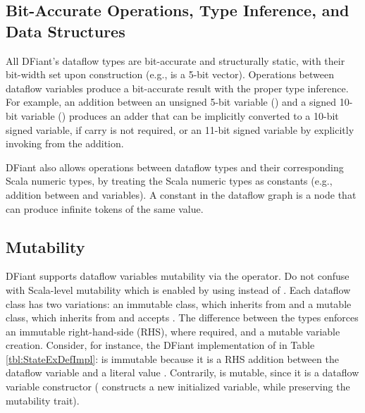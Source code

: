 \subsection{Bit-Accurate Operations, Type Inference, and Data Structures}
All DFiant's dataflow types are bit-accurate and structurally static, with their bit-width set upon construction (e.g.,  is a 5-bit vector). Operations between dataflow variables produce a bit-accurate result with the proper type inference. For example, an addition between an unsigned 5-bit variable () and a signed 10-bit variable () produces an adder that can be implicitly converted to a 10-bit signed variable, if carry is not required, or an 11-bit signed variable by explicitly invoking  from the addition.

DFiant also allows operations between dataflow types and their corresponding Scala numeric types, by treating the Scala numeric types as constants (e.g., addition between  and  variables). A constant in the dataflow graph is a node that can produce infinite tokens of the same value.   

\subsection{Mutability}
\label{sec:mutability}
DFiant supports dataflow variables mutability via the \code{:=} operator. Do not confuse with Scala-level mutability which is enabled by using  instead of . Each dataflow class has two variations: an immutable class, which inherits from  and a mutable class, which inherits from  and accepts \code{:=}. The difference between the types enforces an immutable right-hand-side (RHS), where required, and a mutable variable creation. Consider, for instance, the DFiant implementation of  in Table \ref{tbl:StateExDefImpl}:  is immutable because it is a RHS addition between the dataflow variable  and a literal value . Contrarily,  is mutable, since it is a dataflow variable constructor ( constructs a new initialized variable, while preserving the mutability trait). 


